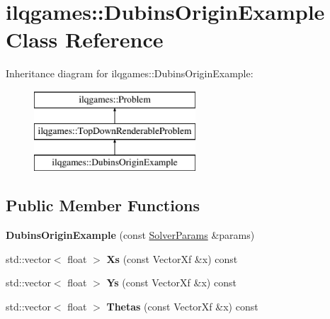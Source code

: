 \hypertarget{classilqgames_1_1_dubins_origin_example}{}\section{ilqgames\+:\+:Dubins\+Origin\+Example Class Reference}
\label{classilqgames_1_1_dubins_origin_example}
Inheritance diagram for ilqgames\+:\+:Dubins\+Origin\+Example\+:\begin{figure}[H]
\begin{center}
\leavevmode
\includegraphics[height=3.000000cm]{classilqgames_1_1_dubins_origin_example}
\end{center}
\end{figure}
\subsection*{Public Member Functions}
\begin{DoxyCompactItemize}
\item 
{\bfseries Dubins\+Origin\+Example} (const \hyperlink{structilqgames_1_1_solver_params}{Solver\+Params} \&params)\hypertarget{classilqgames_1_1_dubins_origin_example_a37132486bdf7878c98a8bb3f35dabacb}{}\label{classilqgames_1_1_dubins_origin_example_a37132486bdf7878c98a8bb3f35dabacb}

\item 
std\+::vector$<$ float $>$ {\bfseries Xs} (const Vector\+Xf \&x) const \hypertarget{classilqgames_1_1_dubins_origin_example_a29910b6c91478b66b64765ce418f5846}{}\label{classilqgames_1_1_dubins_origin_example_a29910b6c91478b66b64765ce418f5846}

\item 
std\+::vector$<$ float $>$ {\bfseries Ys} (const Vector\+Xf \&x) const \hypertarget{classilqgames_1_1_dubins_origin_example_a993f76e0d7549d37973a258c2b78a962}{}\label{classilqgames_1_1_dubins_origin_example_a993f76e0d7549d37973a258c2b78a962}

\item 
std\+::vector$<$ float $>$ {\bfseries Thetas} (const Vector\+Xf \&x) const \hypertarget{classilqgames_1_1_dubins_origin_example_a650be123b88df2bc4fa9c137810b1d6d}{}\label{classilqgames_1_1_dubins_origin_example_a650be123b88df2bc4fa9c137810b1d6d}

\end{DoxyCompactItemize}
